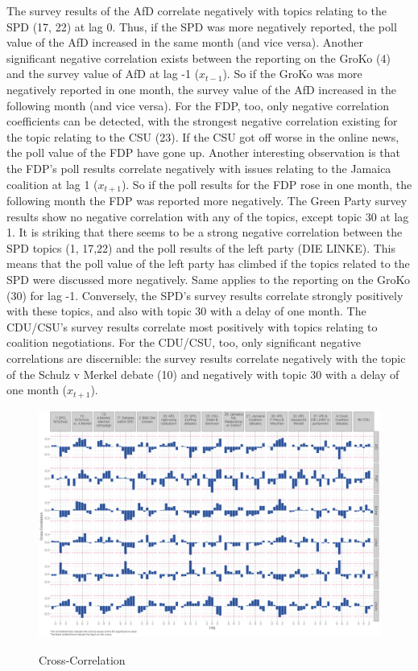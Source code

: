 \documentclass[12pt,a4paper,notitlepage]{article}
\begin{document}
The survey results of the AfD correlate negatively with topics relating to the SPD (17, 22) at lag 0. Thus, if the SPD was more negatively reported, the poll value of the AfD increased in the same month (and vice versa). Another significant negative correlation exists between the reporting on the GroKo (4) and the survey value of AfD at lag -1 ($x_{t-1}$). So if the GroKo was more negatively reported in one month, the survey value of the AfD increased in the following month (and vice versa). For the FDP, too, only negative correlation coefficients can be detected, with the strongest negative correlation existing for the topic relating to the CSU (23). If the CSU got off worse in the online news, the poll value of the FDP have gone up. Another interesting observation is that the FDP's poll results correlate negatively with issues relating to the Jamaica coalition at lag 1 ($x_{t+1}$). So if the poll results for the FDP rose in one month, the following month the FDP was reported more negatively. The Green Party survey results show no negative correlation with any of the topics, except topic 30 at lag 1. It is striking that there seems to be a strong negative correlation between the SPD topics (1, 17,22) and the poll results of the left party (DIE LINKE). This means that the poll value of the left party has climbed if the topics related to the SPD were discussed more negatively. Same applies to the reporting on the GroKo (30) for lag -1. Conversely, the SPD's survey results correlate strongly positively with these topics, and also with topic 30 with a delay of one month. The CDU/CSU's survey results correlate most positively with topics relating to coalition negotiations. For the CDU/CSU, too, only significant negative correlations are discernible: the survey results correlate negatively with the topic of the Schulz v Merkel debate (10) and negatively with topic 30 with a delay of one month ($x_{t+1}$). 

\begin{figure}[H]
	\caption{Cross-Correlation}
	\begin{center}
			\includegraphics[width=\textwidth,keepaspectratio]{../figs/ccf2.png}
			\label{fig_ccf}
	\end{center}
\end{figure} 
\end{document}
